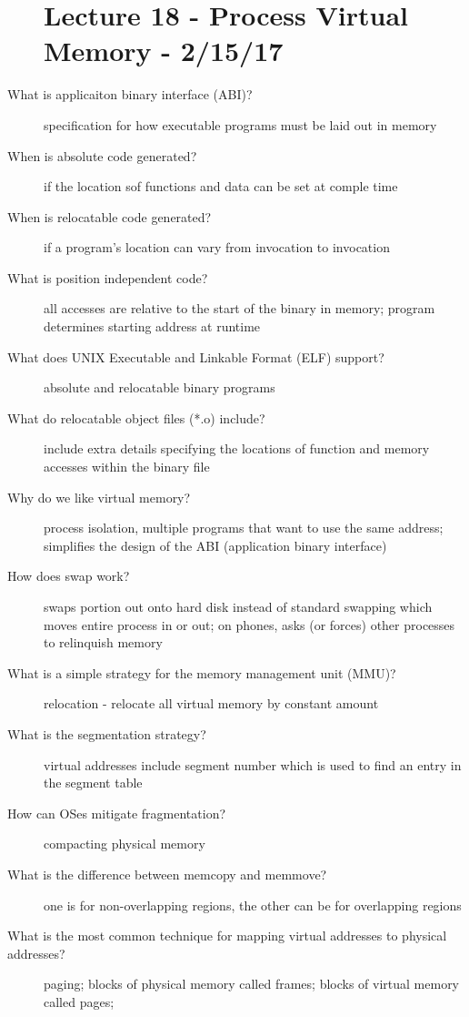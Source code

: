 \documentclass[10pt]{article}
\begin{document}
\begin{description}
\section{Lecture 18 - Process Virtual Memory - 2/15/17}
\item[What is applicaiton binary interface (ABI)?]
  specification for how executable programs must be laid out in memory
\item[When is absolute code generated?]
  if the location sof functions and data can be set at comple time
\item[When is relocatable code generated?]
  if a program's location can vary from invocation to invocation
\item[What is position independent code?]
  all accesses are relative to the start of the binary in memory;
  program determines starting address at runtime
\item[What does UNIX Executable and Linkable Format (ELF) support?]
  absolute and relocatable binary programs
\item[What do relocatable object files (*.o) include?]
  include extra details specifying the locations of function and memory accesses within the binary file
\item[Why do we like virtual memory?]
  process isolation, multiple programs that want to use the same address;
  simplifies the design of the ABI (application binary interface)
\item[How does swap work?]
  swaps portion out onto hard disk instead of standard swapping which moves entire process in or out;
  on phones, asks (or forces) other processes to relinquish memory
\item[What is a simple strategy for the memory management unit (MMU)?]
  relocation - relocate all virtual memory by constant amount
\item[What is the segmentation strategy?]
  virtual addresses include segment number which is used to find an entry in the segment table
\item[How can OSes mitigate fragmentation?]
  compacting physical memory
\item[What is the difference between memcopy and memmove?]
  one is for non-overlapping regions, the other can be for overlapping regions
\item[What is the most common technique for mapping virtual addresses to physical addresses?]
  paging;
  blocks of physical memory called frames;
  blocks of virtual memory called pages;

\end{description}
\end{document}
